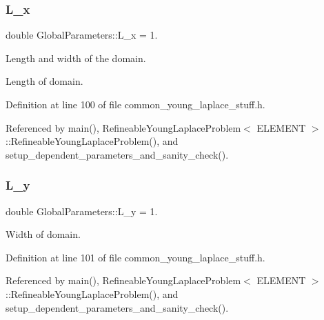 \mbox{\label{namespaceGlobalParameters_a36ebf514fdd1e78fff69907b39e25af6}} 
\subsubsection{\texorpdfstring{L\+\_\+x}{L\_x}}
{\footnotesize\ttfamily double Global\+Parameters\+::\+L\+\_\+x = 1.}



Length and width of the domain. 

Length of domain. 

Definition at line 100 of file common\+\_\+young\+\_\+laplace\+\_\+stuff.\+h.



Referenced by main(), Refineable\+Young\+Laplace\+Problem$<$ E\+L\+E\+M\+E\+N\+T $>$\+::\+Refineable\+Young\+Laplace\+Problem(), and setup\+\_\+dependent\+\_\+parameters\+\_\+and\+\_\+sanity\+\_\+check().

\mbox{\label{namespaceGlobalParameters_ac8774b3418c4551091d64ec72c169b2e}} 
\subsubsection{\texorpdfstring{L\+\_\+y}{L\_y}}
{\footnotesize\ttfamily double Global\+Parameters\+::\+L\+\_\+y = 1.}



Width of domain. 



Definition at line 101 of file common\+\_\+young\+\_\+laplace\+\_\+stuff.\+h.



Referenced by main(), Refineable\+Young\+Laplace\+Problem$<$ E\+L\+E\+M\+E\+N\+T $>$\+::\+Refineable\+Young\+Laplace\+Problem(), and setup\+\_\+dependent\+\_\+parameters\+\_\+and\+\_\+sanity\+\_\+check().

\mbox{\label{namespaceGlobalParameters_ab020cb50fa321b26e8d2127d2cff23b9}} 
